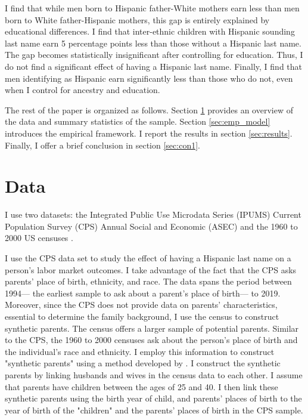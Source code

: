\documentclass[12pt,english]{article}
\begin{document}
I find that while men born to Hispanic father-White mothers earn less than men born to White father-Hispanic mothers, this gap is entirely explained by educational differences. I find that inter-ethnic children with Hispanic sounding last name earn 5 percentage points less than those without a Hispanic last name. The gap becomes statistically insignificant after controlling for education. Thus, I do not find a significant effect of having a Hispanic last name. Finally, I find that men identifying as Hispanic earn significantly less than those who do not, even when I control for ancestry and education.


The rest of the paper is organized as follows. Section \ref{sec:data} provides an overview of the data and summary statistics of the sample. Section \ref{sec:emp_model} introduces the empirical framework. I report the results in section \ref{sec:results}. Finally, I offer a brief conclusion in section \ref{sec:con1}.

\section{Data}\label{sec:data}

I use two datasets:  the Integrated Public Use Microdata Series (IPUMS) Current Population Survey (CPS) Annual Social and Economic (ASEC) \autocite{cps2019} and the 1960 to 2000 US censuses \autocite{acs2019}. 

I use the CPS data set to study the effect of having a Hispanic last name on a person's labor market outcomes. I take advantage of the fact that the CPS asks parents' place of birth, ethnicity, and race. The data spans the period between 1994--- the earliest sample to ask about a parent's place of birth--- to 2019. Moreover, since the CPS does not provide data on parents' characteristics, essential to determine the family background, I use the census to construct synthetic parents. The census offers a larger sample of potential parents. Similar to the CPS, the 1960 to 2000 censuses ask about the person's place of birth and the individual's race and ethnicity. I employ this information to construct "synthetic parents" using a method developed by \textcite{rubinstein2014pride}. I construct the synthetic parents by linking husbands and wives in the census data to each other. I assume that parents have children between the ages of 25 and 40. I then link these synthetic parents using the birth year of child, and parents' places of birth to the year of birth of the "children" and the parents' places of birth in the CPS sample.
\end{document}
